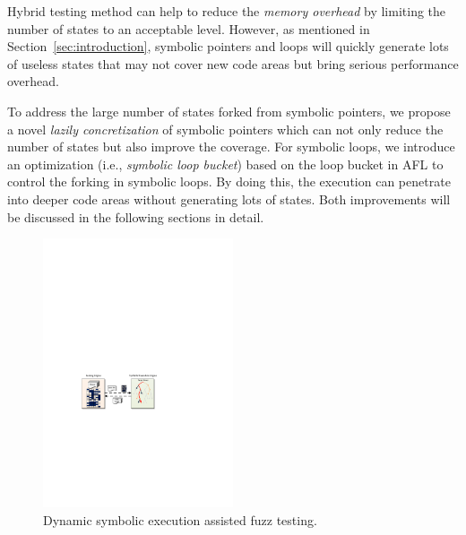 Hybrid testing method can help to reduce the \textit{memory overhead} by limiting the number of states to an acceptable level. However, as mentioned in Section~\ref{sec:introduction}, symbolic pointers and loops will quickly generate lots of useless states that may not cover new code areas but bring serious performance overhead.

To address the large number of states forked from symbolic pointers, we propose a novel \textit{lazily concretization} of symbolic pointers which can not only reduce the number of states but also improve the coverage. 
For symbolic loops, we introduce an optimization (i.e., \textit{symbolic loop bucket}) based on the loop bucket in AFL to control the forking in symbolic loops. By doing this, the execution can penetrate into deeper code areas without generating lots of states.
Both improvements will be discussed in the following sections in detail.

\begin{figure}
\centering
\includegraphics[width=0.5\textwidth]{figures/s2e-assist.pdf} 
\caption{Dynamic symbolic execution assisted fuzz testing.}\label{s2e-assist}
\end{figure}

